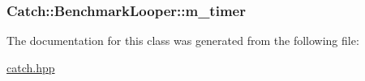 \hypertarget{class_catch_1_1_benchmark_looper_af86aacecba12576f96a1d3f321a0c959}{
\subsubsection[{m\-\_\-timer}]{ Catch\-::\-Benchmark\-Looper\-::m\-\_\-timer\hspace{0.3cm}{\ttfamily [private]}}}\label{class_catch_1_1_benchmark_looper_af86aacecba12576f96a1d3f321a0c959}


The documentation for this class was generated from the following file\-:\begin{DoxyCompactItemize}
\item 
\hyperlink{catch_8hpp}{catch.\-hpp}\end{DoxyCompactItemize}
